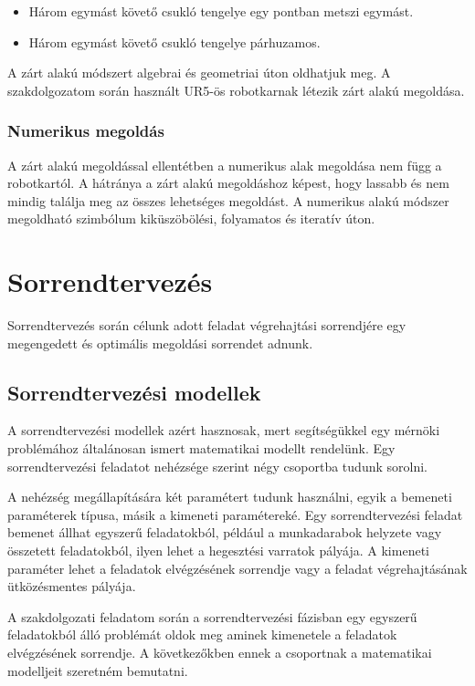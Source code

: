 \begin{itemize}
\item {Három egymást követő csukló tengelye egy pontban metszi egymást.}
\item {Három egymást követő csukló tengelye párhuzamos.} 
\end{itemize}

A zárt alakú módszert algebrai és geometriai úton oldhatjuk meg.
A szakdolgozatom során használt UR5-ös robotkarnak létezik zárt alakú megoldása.

\subsubsection{Numerikus megoldás}

A zárt alakú megoldással ellentétben a numerikus alak megoldása nem függ a robotkartól. A hátránya a zárt alakú megoldáshoz képest, hogy lassabb és nem mindig találja meg az összes lehetséges megoldást. A numerikus alakú módszer megoldható szimbólum kiküszöbölési, folyamatos és iteratív úton.

\cite{Siciliano:2007}


\section{Sorrendtervezés}

Sorrendtervezés során célunk adott feladat végrehajtási sorrendjére egy megengedett és optimális megoldási sorrendet adnunk.

\subsection{Sorrendtervezési modellek}
A sorrendtervezési modellek azért hasznosak, mert segítségükkel egy mérnöki problémához általánosan ismert matematikai modellt rendelünk. Egy sorrendtervezési feladatot nehézsége szerint négy csoportba tudunk sorolni. 

A nehézség megállapítására két paramétert tudunk használni, egyik a bemeneti paraméterek típusa, másik a kimeneti paramétereké. Egy sorrendtervezési feladat bemenet állhat egyszerű feladatokból, például a munkadarabok helyzete vagy összetett feladatokból, ilyen lehet a hegesztési varratok pályája. A kimeneti paraméter lehet a feladatok elvégzésének sorrendje vagy a feladat végrehajtásának ütközésmentes pályája. 

A szakdolgozati feladatom során a sorrendtervezési fázisban egy egyszerű feladatokból álló problémát oldok meg aminek kimenetele a feladatok elvégzésének sorrendje. A következőkben ennek a csoportnak a matematikai modelljeit szeretném bemutatni.

